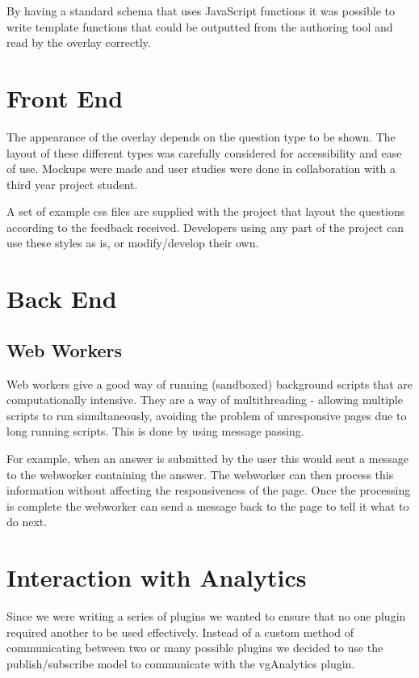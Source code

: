 By having a standard schema that uses JavaScript functions it was possible to write template functions that could be outputted from the authoring tool and read by the overlay correctly.
\section{Front End} 
\label{Section:Front end}
The appearance of the overlay depends on the question type to be shown. The layout of these different types was carefully considered for accessibility and ease of use. Mockups were made and user studies were done in collaboration with a third year project student.

A set of example css files are supplied with the project that layout the questions according to the feedback received. Developers using any part of the project can use these styles as is, or modify/develop their own.
\section{Back End} 
\label{Section:Back end}
\subsection{Web Workers}
\label{Subsection:WebWorkers}
Web workers give a good way of running (sandboxed) background scripts that are computationally intensive. They are a way of multithreading - allowing multiple scripts to run simultaneously, avoiding the problem of unresponsive pages due to long running scripts. This is done by using message passing. 

For example, when an answer is submitted by the user this would sent a message to the webworker containing the answer. The webworker can then process this information without affecting the responsiveness of the page. Once the processing is complete the webworker can send a message back to the page to tell it what to do next.

\section{Interaction with Analytics}
\label{Section:vgQuestions Analytics}

Since we were writing a series of plugins we wanted to ensure that no one plugin required another to be used effectively. Instead of a custom method of communicating between two or many possible plugins we decided to use the publish/subscribe model to communicate with the vgAnalytics plugin.

